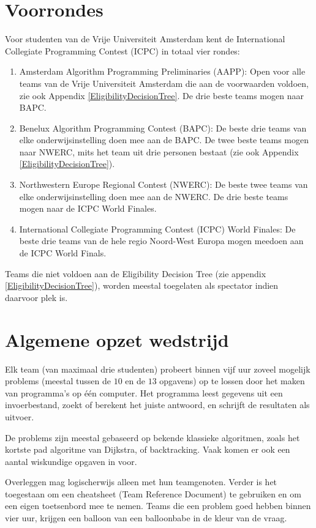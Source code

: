 \section{Voorrondes}
Voor studenten van de Vrije Universiteit Amsterdam kent de International Collegiate Programming Contest (ICPC) in totaal vier rondes:
\begin{enumerate}
\item Amsterdam Algorithm Programming Preliminaries (AAPP): Open voor alle teams van de Vrije Universiteit Amsterdam die aan de voorwaarden voldoen, zie ook Appendix \ref{EligibilityDecisionTree}. De drie beste teams mogen naar BAPC.
\item Benelux Algorithm Programming Contest (BAPC): De beste drie teams van elke onderwijsinstelling doen mee aan de BAPC. De twee beste teams mogen naar NWERC, mits het team uit drie personen bestaat (zie ook Appendix \ref{EligibilityDecisionTree}).
\item Northwestern Europe Regional Contest (NWERC): De beste twee teams van elke onderwijsinstelling doen mee aan de NWERC. De drie beste teams mogen naar de ICPC World Finales.
\item International Collegiate Programming Contest (ICPC) World Finales: De beste drie teams van de hele regio Noord-West Europa mogen meedoen aan de ICPC World Finals.
\end{enumerate}
Teams die niet voldoen aan de Eligibility Decision Tree (zie appendix \ref{EligibilityDecisionTree}), worden meestal toegelaten als spectator indien daarvoor plek is.

\section{Algemene opzet wedstrijd}
Elk team (van maximaal drie studenten) probeert binnen vijf uur zoveel mogelijk problems (meestal tussen de $10$ en de $13$ opgavens) op te lossen door het maken van programma's op \'e\'en computer. Het programma leest gegevens uit een invoerbestand, zoekt of berekent het juiste antwoord, en schrijft de resultaten als uitvoer.

De problems zijn meestal gebaseerd op bekende klassieke algoritmen, zoals het kortste pad algoritme van Dijkstra, of backtracking. Vaak komen er ook een aantal wiskundige opgaven in voor.

Overleggen mag logischerwijs alleen met hun teamgenoten. Verder is het toegestaan om een cheatsheet (Team Reference Document) te gebruiken en om een eigen toetsenbord mee te nemen. Teams die een problem goed hebben binnen vier uur, krijgen een balloon van een balloonbabe in de kleur van de vraag.

